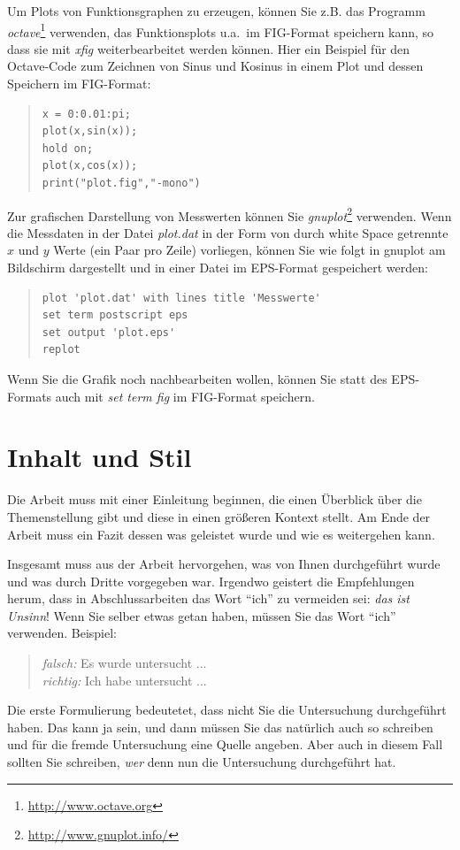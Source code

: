 \documentclass[12pt]{article}
\begin{document}
Um Plots von Funktionsgraphen zu erzeugen, können Sie z.B. das Programm
{\em octave}\footnote{\url{http://www.octave.org}} verwenden, das Funktionsplots
u.a.~im FIG-Format speichern kann, so dass sie mit {\em xfig} \cite{xfig}
weiterbearbeitet werden können. Hier ein Beispiel für den Octave-Code zum
Zeichnen von Sinus und Kosinus in einem Plot und dessen Speichern im
FIG-Format:
\begin{quote}
\begin{verbatim}
x = 0:0.01:pi;
plot(x,sin(x));
hold on;
plot(x,cos(x));
print("plot.fig","-mono")
\end{verbatim}
\end{quote}
Zur grafischen Darstellung von Messwerten können Sie
{\em gnuplot}\footnote{\url{http://www.gnuplot.info/}} verwenden.
Wenn die Messdaten in der Datei {\em plot.dat} in der Form von durch
white Space getrennte $x$ und $y$ Werte (ein Paar pro Zeile) vorliegen,
können Sie wie folgt in gnuplot am Bildschirm dargestellt und in einer
Datei im EPS-Format gespeichert werden:
\begin{quote}
\begin{verbatim}
plot 'plot.dat' with lines title 'Messwerte'
set term postscript eps
set output 'plot.eps'
replot
\end{verbatim}
\end{quote}
Wenn Sie die Grafik noch nachbearbeiten wollen, können Sie statt des EPS-Formats
auch mit {\em set term fig} im FIG-Format speichern.

\section{Inhalt und Stil}
Die Arbeit muss mit einer Einleitung beginnen, die einen Überblick über die
Themenstellung gibt und diese in einen größeren Kontext stellt. Am Ende
der Arbeit muss ein Fazit dessen was geleistet wurde und wie es weitergehen
kann.

Insgesamt muss aus der Arbeit hervorgehen, was von Ihnen durchgeführt wurde
und was durch Dritte vorgegeben war. Irgendwo geistert die Empfehlungen herum,
dass in Abschlussarbeiten das Wort ``ich'' zu vermeiden sei: 
{\em das ist Unsinn}!
Wenn Sie selber etwas getan haben, müssen Sie das Wort ``ich'' verwenden.
Beispiel:
\begin{verse}
{\em falsch:} Es wurde untersucht ...\\
{\em richtig:} Ich habe untersucht ...
\end{verse}
Die erste Formulierung bedeutetet, dass nicht Sie die Untersuchung
durchgeführt haben. Das kann ja sein, und dann müssen Sie das natürlich
auch so schreiben und für die fremde Untersuchung eine Quelle angeben.
Aber auch in diesem Fall sollten Sie schreiben, {\em wer} denn nun die
Untersuchung durchgeführt hat.
\end{document}
